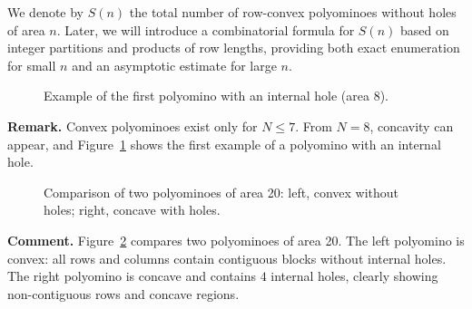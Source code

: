 \documentclass{article}
\theoremstyle{definition}
\theoremstyle{plain}
\begin{document}
We denote by $S(n)$ the total number of row-convex polyominoes without 
holes of area $n$. Later, we will introduce a combinatorial formula for 
$S(n)$ based on integer partitions and products of row lengths, providing 
both exact enumeration for small $n$ and an asymptotic estimate for 
large $n$.

\begin{figure}[H]
\centering
{}
\caption{Example of the first polyomino with an internal hole (area 8).}
\label{fig:polyomino_hole}
\end{figure}

\textbf{Remark.} Convex polyominoes exist only for $N \le 7$. From 
$N = 8$, concavity can appear, and Figure~\ref{fig:polyomino_hole} shows 
the first example of a polyomino with an internal hole.

\begin{figure}[H]
\centering
{}
\caption{Comparison of two polyominoes of area 20: left, convex without 
holes; right, concave with holes.}
\label{fig:convex_vs_concave_frastagliated}
\end{figure}

\noindent
\textbf{Comment.} Figure~\ref{fig:convex_vs_concave_frastagliated} 
compares two polyominoes of area 20. The left polyomino is convex: all 
rows and columns contain contiguous blocks without internal holes. The 
right polyomino is concave and contains $4$ internal holes, clearly 
showing non-contiguous rows and concave regions.
\end{document}
